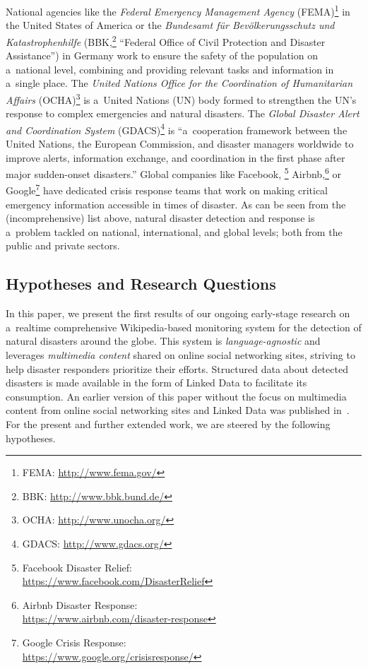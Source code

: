 \documentclass[letterpaper]{article}
\begin{document}
National agencies like the
\emph{Federal Emergency Management Agency}
(FEMA)\footnote{FEMA: \url{http://www.fema.gov/}}
in the United States of America or the
\emph{Bundesamt für Bevölkerungsschutz und Katastrophenhilfe}
(BBK,\footnote{BBK: \url{http://www.bbk.bund.de/}}
``Federal Office of Civil Protection and Disaster Assistance'')
in Germany work to ensure the safety of the population
on a~national level, combining and providing relevant tasks
and information in a~single place.
The \emph{United Nations Office for the Coordination of Humanitarian Affairs}
(OCHA)\footnote{OCHA: \url{http://www.unocha.org/}}
is a~United Nations (UN) body formed to strengthen the UN's response
to complex emergencies and natural disasters.
The \emph{Global Disaster Alert and Coordination System}
(GDACS)\footnote{GDACS: \url{http://www.gdacs.org/}}
is ``a~cooperation framework between the United Nations,
the European Commission, and disaster managers worldwide
to improve alerts, information exchange, and coordination
in the first phase after major sudden-onset disasters.''
Global companies like Facebook,%
\footnote{Facebook Disaster Relief:\\\null\hspace{2em}
\url{https://www.facebook.com/DisasterRelief}}
Airbnb,\footnote{Airbnb Disaster Response:\\\null\hspace{2em}
\url{https://www.airbnb.com/disaster-response}} or
Google\footnote{Google Crisis Response:\\\null\hspace{2em}
\url{https://www.google.org/crisisresponse/}}
have dedicated crisis response teams that work on
making critical emergency information accessible in times of disaster.
As can be seen from the (incomprehensive) list above,
natural disaster detection and response is a~problem
tackled on national, international, and global levels;
both from the public and private sectors.

\subsection{Hypotheses and Research Questions}

In this paper, we present the first results of
our ongoing early-stage research
on a~realtime comprehensive Wikipedia-based monitoring system
for the detection of natural disasters around the globe.
This system is \emph{language-agnostic} and leverages
\emph{multimedia content} shared on online social networking sites,
striving to help disaster responders prioritize their efforts.
Structured data about detected disasters is made available
in the form of Linked Data to facilitate its consumption.
An earlier version of this paper without the focus
on multimedia content from online social networking sites and Linked Data
was published in~\cite{steiner2014disaster}.
For the present and further extended work, we are steered by the following hypotheses.
\end{document}
